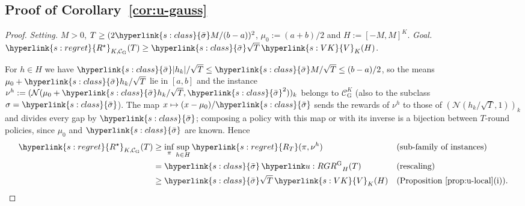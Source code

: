 \documentclass[11pt]{article}
\DeclareRobustCommand{\sy}[2]{{\hyperlink{#1}{#2}}}
\newcommand{\1}{\mathbf{1}}
\newcommand{\RT}{\sy{s:regret}{R_T}}
\newcommand{\Rs}{\sy{s:regret}{R^\star}}
\newcommand{\sbar}{\sy{s:class}{\bar\sigma}}
\newcommand{\VK}{\sy{s:VK}{V}}
\begin{document}
\subsection{Proof of Corollary~\ref{cor:u-gauss}}
\begin{proof}
\textit{Setting.} $M>0$, $T\ge(2\sbar M/(b-a))^2$, $\mu_0:=(a+b)/2$ and $H:=[-M,M]^K$. \textit{Goal.} $\Rs_{K,\mathcal C_{\mathrm G}}(T)\ge\sbar\sqrt T\,\VK_K(H)$.

For $h\in H$ we have $\sbar|h_k|/\sqrt T\le\sbar M/\sqrt T\le(b-a)/2$, so the means $\mu_0+\sbar h_k/\sqrt T$ lie in $[a,b]$ and the instance
$\nu^h:=(\mathcal N(\mu_0+\sbar h_k/\sqrt T,\sbar^2))_k$ belongs to $\mathcal C_{\mathrm G}^K$ (also to the subclass $\sigma=\sbar$). The map
$x\mapsto(x-\mu_0)/\sbar$ sends the rewards of $\nu^h$ to those of $(\mathcal N(h_k/\sqrt T,1))_k$ and divides every gap by $\sbar$; composing a policy with this map
or with its inverse is a bijection between $T$-round policies, since $\mu_0$ and $\sbar$ are known. Hence
\begin{align*}
\Rs_{K,\mathcal C_{\mathrm G}}(T)&\ge\inf_\pi\sup_{h\in H}\RT(\pi,\nu^h) &&\text{(sub-family of instances)}\\
&=\sbar\,\uRG_H(T) &&\text{(rescaling)}\\
&\ge\sbar\sqrt T\,\VK_K(H) &&\text{(Proposition~\ref{prop:u-local}(i))}.\qedhere
\end{align*}
\end{proof}
\end{document}
